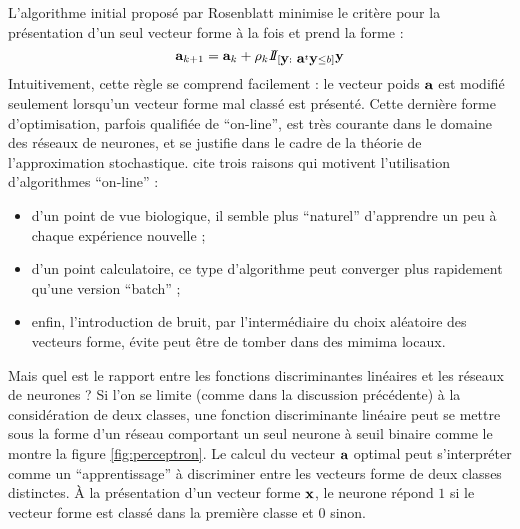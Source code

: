 L'algorithme initial propos\'e par Rosenblatt minimise
le crit\`ere pour la pr\'esentation
d'un seul vecteur forme \`a la fois et prend la forme :
$$
\mbox{\bf a}_{k+1}= \mbox{\bf a}_k + \rho_k I\!\!I_{\left [ \mbox{\bf y} : \  \mbox{\bf a}^t \mbox{\bf y} \leq  b \right ] } \mbox{\bf y}
$$
Intuitivement, cette r\`egle se comprend facilement :  le vecteur poids $\mbox{\bf a}$
est modifi\'e seulement lorsqu'un vecteur forme mal class\'e est pr\'esent\'e. 
Cette derni\`ere forme d'optimisation, parfois qualifi\'ee de ``on-line'', est
tr\`es courante dans le domaine des r\'eseaux de neurones, et se justifie
dans le cadre de la th\'eorie de l'approximation stochastique. 
cite trois raisons qui motivent l'utilisation d'algorithmes ``on-line'' :
\begin{itemize}
\item d'un point de vue biologique, il semble plus ``naturel'' d'apprendre
un peu \`a chaque exp\'erience nouvelle ; 
\item d'un point calculatoire, ce type d'algorithme peut converger plus rapidement qu'une
version ``batch'' ;
\item enfin, l'introduction de bruit, par l'interm\'ediaire du choix al\'eatoire des
vecteurs forme, \'evite peut \^etre de tomber dans des mimima locaux. 
\end{itemize}

Mais quel est le rapport entre les fonctions  discriminantes lin\'eaires et 
les r\'eseaux de neurones ?  Si l'on se limite (comme dans la discussion pr\'ec\'edente) \`a la 
consid\'eration de deux classes, une fonction discriminante lin\'eaire peut se mettre
sous la forme d'un r\'eseau comportant un seul neurone \`a seuil binaire comme
le montre la figure \ref{fig:perceptron}. Le calcul du vecteur $\mbox{\bf a}$ optimal peut
s'interpr\'eter comme un ``apprentissage'' \`a discriminer entre les vecteurs forme
de deux classes distinctes. \`A la pr\'esentation
d'un vecteur forme $\mbox{\bf x}$, le neurone r\'epond $1$ si le vecteur forme est class\'e
dans la premi\`ere classe et $0$ sinon.  



